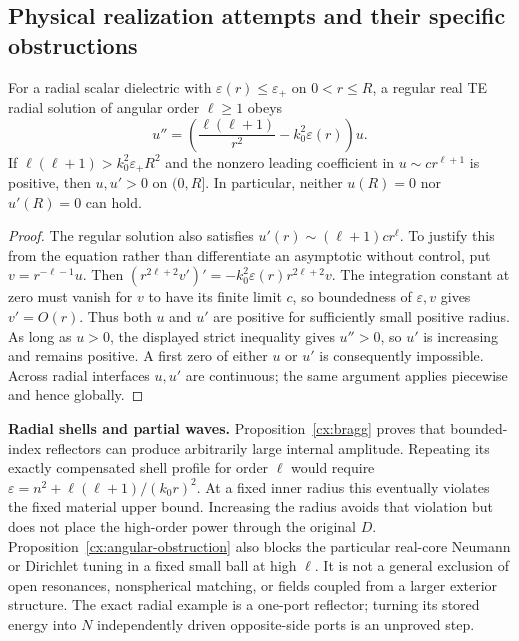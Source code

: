 \subsection{Physical realization attempts and their specific obstructions}

\begin{proposition}
\label{cx:angular-obstruction}
For a radial scalar dielectric with $\varepsilon(r)\leq\varepsilon_+$
on $0<r\leq R$, a regular real TE radial solution of angular order
$\ell\geq1$ obeys
\begin{equation}
 u''=\left(\frac{\ell(\ell+1)}{r^2}-k_0^2\varepsilon(r)\right)u.
 \label{cx:angular-equation}
\end{equation}
If $\ell(\ell+1)>k_0^2\varepsilon_+R^2$ and the nonzero leading
coefficient in $u\sim cr^{\ell+1}$ is positive, then $u,u'>0$ on
$(0,R]$. In particular, neither $u(R)=0$ nor $u'(R)=0$ can hold.
\end{proposition}

\begin{proof}
The regular solution also satisfies
$u'(r)\sim(\ell+1)c r^\ell$. To justify this from the equation rather
than differentiate an asymptotic without control, put
$v=r^{-\ell-1}u$. Then
$(r^{2\ell+2}v')'=-k_0^2\varepsilon(r)r^{2\ell+2}v$.
The integration constant at zero must vanish for $v$ to have its finite
limit $c$, so boundedness of $\varepsilon,v$ gives $v'=O(r)$.
Thus both $u$ and $u'$ are positive for sufficiently small positive radius.
As long as $u>0$, the displayed strict inequality gives $u''>0$, so
$u'$ is increasing and remains positive. A first zero of either $u$
or $u'$ is consequently impossible. Across radial interfaces $u,u'$
are continuous; the same argument applies piecewise and hence globally.
\end{proof}

\noindent\textbf{Radial shells and partial waves.}
Proposition~\ref{cx:bragg} proves that bounded-index reflectors can produce
arbitrarily large internal amplitude. Repeating its exactly compensated
shell profile for order $\ell$ would require
$\varepsilon=n^2+\ell(\ell+1)/(k_0r)^2$. At a fixed inner radius this
eventually violates the fixed material upper bound. Increasing the
radius avoids that violation but does not place the high-order power
through the original $D$. Proposition~\ref{cx:angular-obstruction}
also blocks the particular real-core Neumann or Dirichlet tuning in a
fixed small ball at high $\ell$. It is not a general exclusion of open
resonances, nonspherical matching, or fields coupled from a larger
exterior structure. The exact radial example is a one-port reflector;
turning its stored energy into $N$ independently driven opposite-side
ports is an unproved step.

